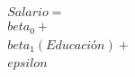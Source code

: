 \documentclass[preview]{standalone}
\begin{document}
\begin{align*}
Salario = \\beta_0 + \\beta_1 (Educación) + \\epsilon
\end{align*}
\end{document}
